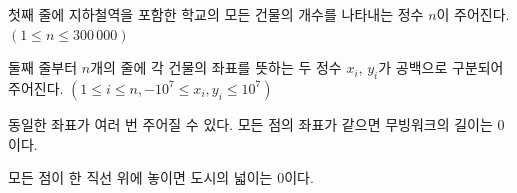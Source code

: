 첫째 줄에 지하철역을 포함한 학교의 모든 건물의 개수를 나타내는 정수 $n$이 주어진다. $(1 \le n \le 300\,000)$

둘째 줄부터 $n$개의 줄에 각 건물의 좌표를 뜻하는 두 정수 $x_i$, $y_i$가 공백으로 구분되어 주어진다. $(1 \le i \le n, -10^7 \le x_i, y_i \le 10^7)$

동일한 좌표가 여러 번 주어질 수 있다.
모든 점의 좌표가 같으면 무빙워크의 길이는 0이다.

모든 점이 한 직선 위에 놓이면 도시의 넓이는 0이다.
